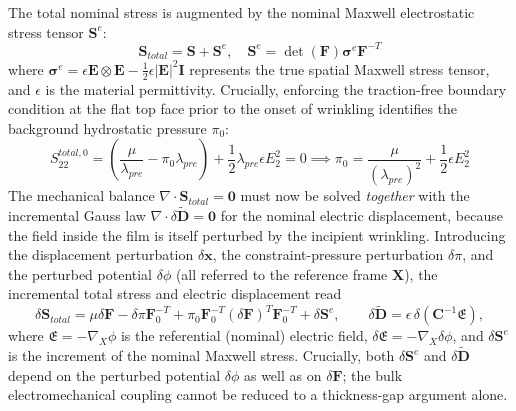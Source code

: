 \documentclass[final,3p,times]{elsarticle}
\begin{document}
The total nominal stress is augmented by the nominal Maxwell electrostatic stress tensor $\mathbf{S}^e$:
\begin{equation}
	\mathbf{S}_{total} = \mathbf{S} + \mathbf{S}^e, \quad \mathbf{S}^e = \det(\mathbf{F}) \boldsymbol{\sigma}^e \mathbf{F}^{-T}
\end{equation}
where $\boldsymbol{\sigma}^e = \epsilon \mathbf{E} \otimes \mathbf{E} - \frac{1}{2}\epsilon |\mathbf{E}|^2 \mathbf{I}$ represents the true spatial Maxwell stress tensor, and $\epsilon$ is the material permittivity. Crucially, enforcing the traction-free boundary condition at the flat top face prior to the onset of wrinkling identifies the background hydrostatic pressure $\pi_0$:
\begin{equation}
	S_{22}^{total, 0} = \left(\frac{\mu}{\lambda_{pre}} - \pi_0 \lambda_{pre}\right) + \frac{1}{2}\lambda_{pre}\epsilon E_2^2 = 0 \implies \pi_0 = \frac{\mu}{(\lambda_{pre})^2} + \frac{1}{2}\epsilon E_2^2
\end{equation}
The mechanical balance $\nabla\cdot\mathbf{S}_{total}=\mathbf{0}$ must now be solved \emph{together} with the incremental Gauss law $\nabla\cdot\delta\tilde{\mathbf{D}}=\mathbf{0}$ for the nominal electric displacement, because the field inside the film is itself perturbed by the incipient wrinkling. Introducing the displacement perturbation $\delta\mathbf{x}$, the constraint-pressure perturbation $\delta\pi$, and the perturbed potential $\delta\phi$ (all referred to the reference frame $\mathbf{X}$), the incremental total stress and electric displacement read
\begin{equation}
	\delta\mathbf{S}_{total} = \mu \delta\mathbf{F} - \delta\pi \mathbf{F}^{-T}_{0} + \pi_{0} \mathbf{F}^{-T}_{0} (\delta\mathbf{F})^T \mathbf{F}^{-T}_{0} + \delta \mathbf{S}^e,
	\qquad
	\delta\tilde{\mathbf{D}}=\epsilon\,\delta\!\left(\mathbf{C}^{-1}\boldsymbol{\mathfrak{E}}\right),
	\label{eq:incr_total}
\end{equation}
where $\boldsymbol{\mathfrak{E}}=-\nabla_{\!X}\phi$ is the referential (nominal) electric field, $\delta\boldsymbol{\mathfrak{E}}=-\nabla_{\!X}\delta\phi$, and $\delta\mathbf{S}^e$ is the increment of the nominal Maxwell stress. Crucially, both $\delta\mathbf{S}^e$ and $\delta\tilde{\mathbf{D}}$ depend on the perturbed potential $\delta\phi$ as well as on $\delta\mathbf{F}$; the bulk electromechanical coupling cannot be reduced to a thickness-gap argument alone.
\end{document}
